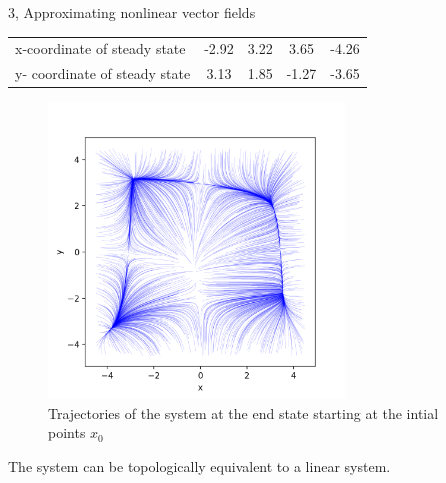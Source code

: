 \documentclass[10pt,a4paper]{article}
\begin{document}
\begin{task}{3, Approximating nonlinear vector fields}
\begin{tabular}{|l|c|c|c|c|}
\hline
x-coordinate of steady state& -2.92&3.22&3.65&-4.26\\
y- coordinate of steady state& 3.13&1.85&-1.27&-3.65\\
\hline
\end{tabular}
\begin{figure}[H]
\centering
\includegraphics[width=0.7\textwidth]{../plots/task3_part32.png}
\caption{Trajectories of the system at the end state starting at the intial points $x_0$}
\label{fig:task3_part3}
\end{figure}
The system can be topologically equivalent to a linear system.
\end{task}
\end{document}
